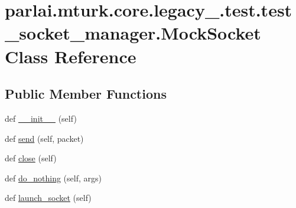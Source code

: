 \hypertarget{classparlai_1_1mturk_1_1core_1_1legacy__2018_1_1test_1_1test__socket__manager_1_1MockSocket}{}\section{parlai.\+mturk.\+core.\+legacy\+\_.\+test.\+test\+\_\+socket\+\_\+manager.\+Mock\+Socket Class Reference}
\label{classparlai_1_1mturk_1_1core_1_1legacy__2018_1_1test_1_1test__socket__manager_1_1MockSocket}
\subsection*{Public Member Functions}
\begin{DoxyCompactItemize}
\item 
def \hyperlink{classparlai_1_1mturk_1_1core_1_1legacy__2018_1_1test_1_1test__socket__manager_1_1MockSocket_a1b95f4ed880e7137acd5ed6b03ae3f09}{\+\_\+\+\_\+init\+\_\+\+\_\+} (self)
\item 
def \hyperlink{classparlai_1_1mturk_1_1core_1_1legacy__2018_1_1test_1_1test__socket__manager_1_1MockSocket_a975ba8e22a8030a58a8a199a580693c8}{send} (self, packet)
\item 
def \hyperlink{classparlai_1_1mturk_1_1core_1_1legacy__2018_1_1test_1_1test__socket__manager_1_1MockSocket_afe536133363b2fb0a2df29a067d58c87}{close} (self)
\item 
def \hyperlink{classparlai_1_1mturk_1_1core_1_1legacy__2018_1_1test_1_1test__socket__manager_1_1MockSocket_a8b738cb107a8f4b45e5c523d5553de1c}{do\+\_\+nothing} (self, args)
\item 
def \hyperlink{classparlai_1_1mturk_1_1core_1_1legacy__2018_1_1test_1_1test__socket__manager_1_1MockSocket_a5a372676072282a22ab76b9480a4b937}{launch\+\_\+socket} (self)
\end{DoxyCompactItemize}
